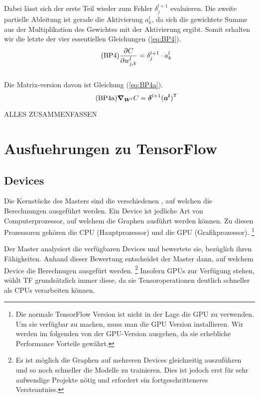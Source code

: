\begin{appendices}
\\
Dabei lässt sich der erste Teil wieder zum Fehler $\delta_j^{l+1}$ evaluieren.
Die zweite partielle Ableitung ist gerade die Aktivierung $a_k^l$, da sich die
gewichtete Summe aus der Multiplikation des Gewichtes mit der Aktivierung ergibt.
Somit erhalten wir die letzte der vier essentiellen Gleichungen (\ref{eq:BP4}).
\begin{equation}\tag{BP4}\label{eq:BP4}
  \frac{\partial C}{\partial w_{j,k}^l} = \delta_j^{l+1} \cdot a_k^l
\end{equation}
\\
Die Matrix-version davon ist Gleichung (\ref{eq:BP4a}).
\begin{equation}\tag{BP4a}\label{eq:BP4a}
  \bm{\nabla}_{\bm{W}^l} C = \bm{\delta}^{l+1} (\bm{a^l})^{\mathsf{T}}
\end{equation}

ALLES ZUSAMMENFASSEN

\cite{Nielsen}

\chapter{Ausfuehrungen zu TensorFlow}\label{sec:anhang_tf}
\section*{Devices}
Die Kernstücke des Masters sind die verschiedenen , auf
welchen die Berechnungen ausgeführt werden. Ein Device ist jedliche Art von
Computerprozessor, auf welchem die Graphen ausführt werden können.
Zu diesen Prozessoren gehören die CPU (Hauptprozessor) und die GPU (Grafikprozessor).
\footnote{
  Die normale TensorFlow Version ist nicht in der Lage die GPU zu verwenden. Um
  sie verfügbar zu machen, muss man die GPU Version installieren. Wir werden im folgenden
  von der GPU-Version ausgehen, da sie erhebliche Performance Vorteile gewährt.
}
\para{}

Der Master analysiert die verfügbaren Devices und bewertete sie, bezüglich
ihren Fähigkeiten. Anhand dieser Bewertung entscheidet der Master dann, auf
welchem Device die Berechnugen ausgefürt werden.
\footnote{
  Es ist möglich die Graphen auf mehreren Devices gleichzeitig auszuführen und
  so noch schneller die Modelle zu trainieren. Dies ist jedoch erst für sehr
  aufwendige Projekte nötig und erfordert ein fortgeschritteneres Versteantniss.
}
Insofern GPUs zur Verfügung stehen, wählt TF grundsätzlich immer diese, da
sie Tensoroperationen deutlich schneller als CPUs verarbeiten können.


\end{appendices}
